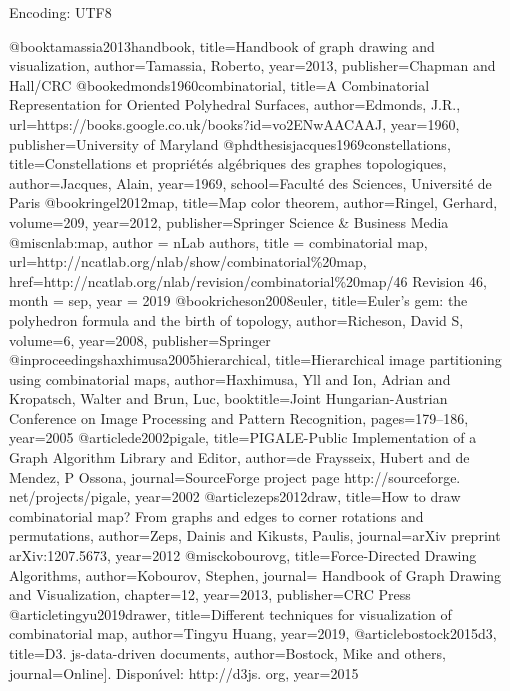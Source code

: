   Encoding: UTF8

  @book{tamassia2013handbook,
    title={Handbook of graph drawing and visualization},
    author={Tamassia, Roberto},
    year={2013},
    publisher={Chapman and Hall/CRC}
  }
  @book{edmonds1960combinatorial,
  title={A Combinatorial Representation for Oriented Polyhedral Surfaces},
  author={Edmonds, J.R.},
  url={https://books.google.co.uk/books?id=vo2ENwAACAAJ},
  year={1960},
  publisher={University of Maryland}
  }
  @phdthesis{jacques1969constellations,
    title={Constellations et propri{\'e}t{\'e}s alg{\'e}briques des graphes topologiques},
    author={Jacques, Alain},
    year={1969},
    school={Facult{\'e} des Sciences, Universit{\'e} de Paris}
  }
  @book{ringel2012map,
    title={Map color theorem},
    author={Ringel, Gerhard},
    volume={209},
    year={2012},
    publisher={Springer Science \& Business Media}
  }
  @misc{nlab:map,
    author = {{nLab authors}},
    title = {combinatorial map},
    url={http://ncatlab.org/nlab/show/combinatorial\%20map},
    href={{http://ncatlab.org/nlab/revision/combinatorial\%20map/46} {Revision 46}},
    month = sep,
    year = {2019}
  }
  @book{richeson2008euler,
    title={Euler's gem: the polyhedron formula and the birth of topology},
    author={Richeson, David S},
    volume={6},
    year={2008},
    publisher={Springer}
  }
  @inproceedings{haxhimusa2005hierarchical,
    title={Hierarchical image partitioning using combinatorial maps},
    author={Haxhimusa, Yll and Ion, Adrian and Kropatsch, Walter and Brun, Luc},
    booktitle={Joint Hungarian-Austrian Conference on Image Processing and Pattern Recognition},
    pages={179--186},
    year={2005}
  }
  @article{de2002pigale,
    title={PIGALE-Public Implementation of a Graph Algorithm Library and Editor},
    author={de Fraysseix, Hubert and de Mendez, P Ossona},
    journal={SourceForge project page http://sourceforge. net/projects/pigale},
    year={2002}
  }
  @article{zeps2012draw,
    title={How to draw combinatorial map? From graphs and edges to corner rotations and permutations},
    author={Zeps, Dainis and Kikusts, Paulis},
    journal={arXiv preprint arXiv:1207.5673},
    year={2012}
  }
  @misc{kobourovg,
    title={Force-Directed Drawing Algorithms},
    author={Kobourov, Stephen},
    journal={ Handbook of Graph Drawing and Visualization},
     chapter={12},
      year={2013},
    publisher={CRC Press}
  }
  @article{tingyu2019drawer,
    title={Different techniques for visualization of combinatorial map},
    author={Tingyu Huang},
    year={2019},
  }
  @article{bostock2015d3,
    title={D3. js-data-driven documents},
    author={Bostock, Mike and others},
    journal={Online]. Dispon{\'\i}vel: http://d3js. org},
    year={2015}
  }
